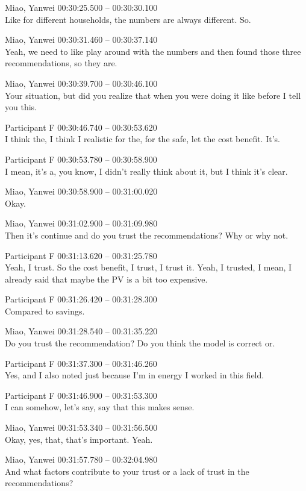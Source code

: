 {Miao, Yanwei 00:30:25.500 -- 00:30:30.100 \\
Like for different households, the numbers are always different. So.

Miao, Yanwei 00:30:31.460 -- 00:30:37.140 \\
Yeah, we need to like play around with the numbers and then found those three recommendations, so they are.

Miao, Yanwei 00:30:39.700 -- 00:30:46.100 \\
Your situation, but did you realize that when you were doing it like before I tell you this.

Participant F 00:30:46.740 -- 00:30:53.620 \\
I think the, I think I realistic for the, for the safe, let the cost benefit. It's.

Participant F 00:30:53.780 -- 00:30:58.900 \\
I mean, it's a, you know, I didn't really think about it, but I think it's clear.

Miao, Yanwei 00:30:58.900 -- 00:31:00.020 \\
Okay.

Miao, Yanwei 00:31:02.900 -- 00:31:09.980 \\
Then it's continue and do you trust the recommendations? Why or why not.

Participant F 00:31:13.620 -- 00:31:25.780 \\
Yeah, I trust. So the cost benefit, I trust, I trust it. Yeah, I trusted, I mean, I already said that maybe the PV is a bit too expensive.

Participant F 00:31:26.420 -- 00:31:28.300 \\
Compared to savings.

Miao, Yanwei 00:31:28.540 -- 00:31:35.220 \\
Do you trust the recommendation? Do you think the model is correct or.

Participant F 00:31:37.300 -- 00:31:46.260 \\
Yes, and I also noted just because I'm in energy I worked in this field.

Participant F 00:31:46.900 -- 00:31:53.300 \\
I can somehow, let's say, say that this makes sense.

Miao, Yanwei 00:31:53.340 -- 00:31:56.500 \\
Okay, yes, that, that's important. Yeah.

Miao, Yanwei 00:31:57.780 -- 00:32:04.980 \\
And what factors contribute to your trust or a lack of trust in the recommendations?

}
